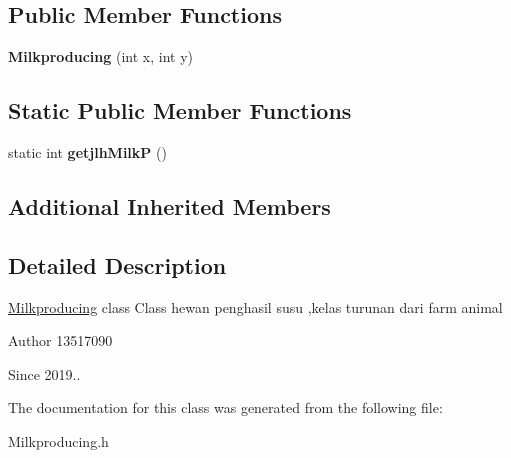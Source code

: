 \subsection*{Public Member Functions}
\begin{DoxyCompactItemize}
\item 
\mbox{\label{classMilkproducing_a74aa25fa5febb55d3e422cebd2d6687a}} 
{\bfseries Milkproducing} (int x, int y)
\end{DoxyCompactItemize}
\subsection*{Static Public Member Functions}
\begin{DoxyCompactItemize}
\item 
\mbox{\label{classMilkproducing_af7dfdeef241b56fc0daf703ded376a4b}} 
static int {\bfseries getjlh\+MilkP} ()
\end{DoxyCompactItemize}
\subsection*{Additional Inherited Members}


\subsection{Detailed Description}
\hyperlink{classMilkproducing}{Milkproducing} class Class hewan penghasil susu ,kelas turunan dari farm animal \begin{DoxyAuthor}{Author}
13517090 
\end{DoxyAuthor}
\begin{DoxySince}{Since}
2019.. 
\end{DoxySince}


The documentation for this class was generated from the following file\+:\begin{DoxyCompactItemize}
\item 
Milkproducing.\+h\end{DoxyCompactItemize}
